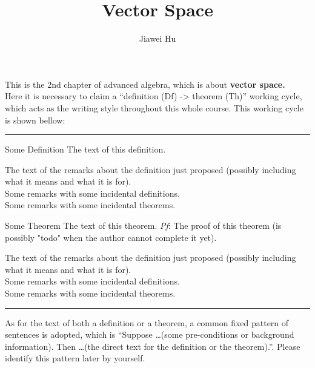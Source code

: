 \documentclass{article}
\title{\LARGE \textbf{Vector Space}}
\author{\large Jiawei Hu}
\begin{document}
\maketitle

This is the 2nd chapter of advanced algebra, which is about \textbf{vector space.}\\
Here it is necessary to claim a ``definition (Df) -> theorem (Th)'' working cycle, which acts as the writing style throughout this whole course. This working cycle is shown bellow:

\noindent\rule{\textwidth}{2pt}
\begin{Df}{Some Definition}
    The text of this definition.
\end{Df}

\begin{Rmk}{}
    The text of the remarks about the definition just proposed (possibly including what it means and what it is for).\\
    \textcolor{Df}{Some remarks with some incidental definitions.}\\
    \textcolor{Th}{Some remarks with some incidental theorems.}
\end{Rmk}

\begin{Th}{Some Theorem}
    The text of this theorem.
    \tcblower
    \textit{Pf}: The proof of this theorem (is possibly "todo" when the author cannot complete it yet).
\end{Th}

\begin{Rmk}{}
    The text of the remarks about the definition just proposed (possibly including what it means and what it is for).\\
    \textcolor{Df}{Some remarks with some incidental definitions.}\\
    \textcolor{Th}{Some remarks with some incidental theorems.}
\end{Rmk}
\noindent\rule{\textwidth}{2pt}
As for the text of both a definition or a theorem, a common fixed pattern of sentences is adopted, which is ``Suppose \dots (some pre-conditions or background information). Then \dots (the direct text for the definition or the theorem).''. Please identify this pattern later by yourself. 
\end{document}
